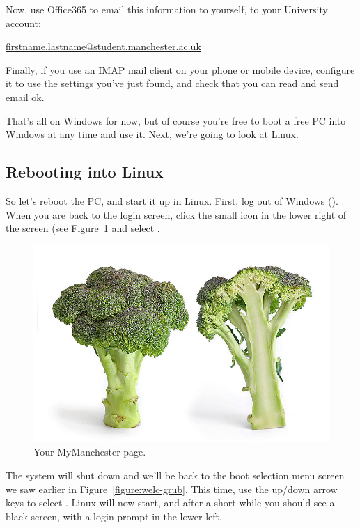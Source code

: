 \splunge

Now, use Office365 to email this information to yourself, to your
University account:

\url{firstname.lastname@student.manchester.ac.uk}

Finally, if you use an IMAP mail client on your phone or mobile
device, configure it to use the settings you've just found, and check
that you can read and send email ok.

That's all on Windows for now, but of course you're free to boot a
free PC into Windows at any time and use it. Next, we're going to look at Linux.

\subsection{Rebooting into Linux}
\label{sec:rebooting-into-linux}

So let's reboot the PC, and start it up in Linux. First, log out of
Windows (\splunge). When you are back to the login screen, click the
small icon in the lower right of the screen (see Figure~\ref{figure:welc-winicon} and select \splunge.

\begin{figure}
\centerline{\includegraphics[width=15cm]{images/broccoli.jpg}}
\caption{Your MyManchester page.}
\label{figure:welc-winicon}
\end{figure}

The system will shut down and we'll be back to the boot selection menu
screen we saw earlier in Figure~\ref{figure:welc-grub}. This time, use
the up/down arrow keys to select \splunge. Linux will now start, and
after a short while you should see a black screen, with a login prompt
in the lower left. 

